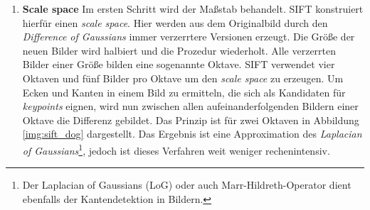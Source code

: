 \begin{enumerate}
	\item \textbf{Scale space} Im ersten Schritt wird der Maßstab behandelt. SIFT konstruiert hierfür einen \textit{scale space}. Hier werden aus dem Originalbild durch den \textit{Difference of Gaussians} immer verzerrtere Versionen erzeugt. Die Größe der neuen Bilder wird halbiert und die Prozedur wiederholt. Alle verzerrten Bilder einer Größe bilden eine sogenannte Oktave. SIFT verwendet vier Oktaven und fünf Bilder pro Oktave um den \textit{scale space} zu erzeugen. Um Ecken und Kanten in einem Bild zu ermitteln, die sich als Kandidaten für \textit{keypoints} eignen, wird nun zwischen allen aufeinanderfolgenden Bildern einer Oktave die Differenz gebildet. Das Prinzip ist für zwei Oktaven in Abbildung \ref{img:sift_dog} dargestellt. Das Ergebnis ist eine Approximation des \textit{Laplacian of Gaussians}\footnote{Der Laplacian of Gaussians (LoG) oder auch Marr-Hildreth-Operator dient ebenfalls der Kantendetektion in Bildern.}, jedoch ist dieses Verfahren weit weniger rechenintensiv. 


\end{enumerate}
